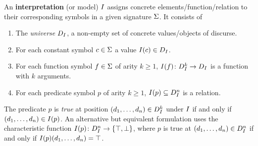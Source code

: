             \begin{definition}[Interpretation]
                An \textbf{interpretation} (or model) $I$ assigns concrete elements/function/relation to their corresponding symbols in a given signature $\Sigma$. It consists of
                \begin{enumerate}
                    \item The \textit{universe} $D_{I}$, a non-empty set of concrete values/objects of discurse.
                    \item For each constant symbol $c\in\Sigma$ a value $I(c)\in D_{I}$.
                    \item For each function symbol $f\in\Sigma$ of arity $k\geq 1$, $I(f)\colon D_{I}^k\to D_{I}$ is a function with $k$ arguments.
                    \item For each predicate symbol $p$ of arity $k\geq 1$, $I(p)\subseteq D_{I}^n$ is a relation.
                \end{enumerate}

            \end{definition}


            The predicate $p$ is \textit{true} at position $(d_1,\ldots,d_n)\in D_{I}^k$ under $I$ if and only if $(d_1,\ldots,d_n)\in I(p)$.
            An alternative but equivalent formulation uses the characteristic function $I(p)\colon D_{I}^n\to\{\top,\bot\}$, where $p$ is true at $(d_1,\ldots,d_n)\in D_{I}^n$ if and only if $I(p)(d_1,\ldots,d_n)=\top$.




